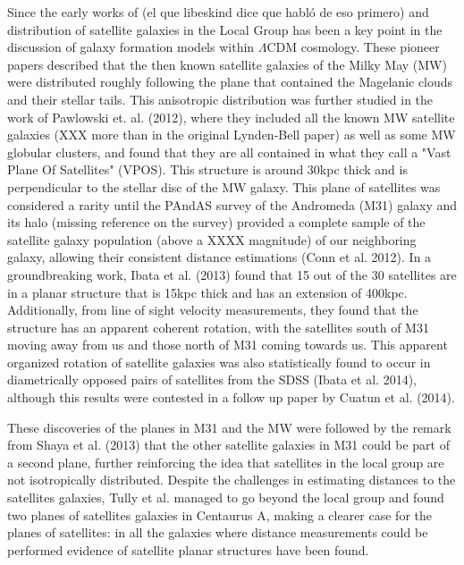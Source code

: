 Since the early works of (el que libeskind dice que habl\'o de
eso primero) and %
distribution of satellite galaxies in the Local Group has been a key
point in the discussion of galaxy formation models within $\Lambda$CDM
cosmology. These pioneer papers described that the then known satellite
galaxies of the Milky May (MW) were distributed roughly following the plane
that contained the Magelanic clouds and their stellar tails. This
anisotropic distribution was further studied in the work of Pawlowski
et. al. (2012), where they included all the known MW satellite galaxies (XXX
more than in the original Lynden-Bell paper) as well as some MW globular
clusters, and found that they are all contained in what they call a
"Vast Plane Of Satellites" (VPOS). This structure is around 30kpc thick and
is perpendicular to the stellar disc of the MW galaxy. This plane of
satellites was considered a rarity until the PAndAS survey of the
Andromeda (M31) galaxy and its halo (missing reference on the survey)
provided a complete sample of the satellite galaxy population (above a
XXXX magnitude) of our neighboring galaxy, allowing their consistent distance
estimations (Conn et al. 2012). In a groundbreaking work, Ibata et
al. (2013) found that 15 out of the 30 satellites are in a planar
structure that is 15kpc thick and has an extension of 400kpc.
Additionally, from line of sight velocity measurements, they
found that the structure has an apparent coherent rotation, with the
satellites south of M31 moving away from us and those north of M31
coming towards us. This apparent organized rotation of satellite galaxies was also
statistically found to occur in diametrically opposed 
pairs of satellites from the SDSS (Ibata et al. 2014), although this
results were contested in a follow up paper by Cuatun et al. (2014).  



These discoveries of the planes in M31 and the MW were followed by the
remark from Shaya et al. (2013) that the other satellite galaxies in
M31 could be part of a second plane, further reinforcing the idea that
satellites in the local group are not isotropically distributed.
Despite the challenges in estimating distances to the satellites
galaxies, Tully et al. managed to go beyond the local group and found
two planes of satellites galaxies in Centaurus A, making a clearer
case for the planes of satellites: in all the galaxies where distance
measurements could be performed evidence of satellite planar
structures have been found.



